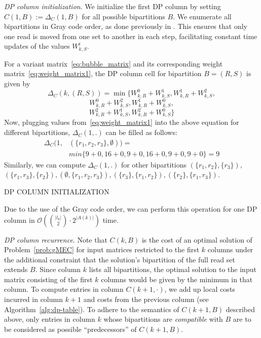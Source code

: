 \textit{DP column initialization}. 
We initialize the first DP column by setting $C(1,B):=\Delta_C(1,B)$ for all possible bipartitions $B$.
We enumerate all bipartitions in Gray code order, as done previously in \cite{patterson2014whatshap}.
This ensures that only one read is moved from one set to another in each step, facilitating constant time updates of the values $W_{k,S}^i$.

For a variant matrix~\eqref{eq:bubble_matrix} and its corresponding weight matrix~\eqref{eq:weight_matrix1}, the DP column cell for bipartition $B=(R,S)$ is given by
\[\Delta_C(k,(R,S))= \min\big\{W^0_{k,R} + W^1_{k,S}, W^1_{k,R} + W^2_{k,S}, \]
\[W^0_{k,R} + W^2_{k,S}, W^1_{k,R} + W^0_{k,S},\]
\[W^2_{k,R} + W^1_{k,S}, W^2_{k,R} + W^0_{k,S} \big\}\]
Now, plugging values from~\eqref{eq:weight_matrix1} into the above equation for different bipartitions, $\Delta_C(1,.)$ can be filled as follows:
\[
\begin{split}
\Delta_C(1,& (\{r_1,r_2,r_3\},\emptyset)) =\\ & min\{9+0, 16+0, 9+0,16+0, 9+0, 9+0\} = 9 
\end{split}
\]
Similarly, we can compute $\Delta_C(1,.)$ for other bipartitions $(\{r_1,r_2\},\{r_3\}),$\\
$(\{r_1,r_3\},\{r_2\}), (\emptyset,\{r_1,r_2,r_3\}), (\{r_3\},\{r_1,r_2\}), (\{r_2\},\{r_1,r_3\})$.

\begin{algorithm}
    \caption{\label{alg:dp-column}\textsc{DP COLUMN INITIALIZATION}}
\end{algorithm}
Due to the use of the Gray code order, we can perform this operation for one DP column in $\mathcal{O}( {|l_k| \choose 2} \cdot 2^{|A(k)|})$ time.

\textit{DP column recurrence}.
Note that $C(k,B)$ is the cost of an optimal solution of Problem~\ref{prob:gMEC} for input matrices restricted to the first $k$ columns under the additional constraint that the solution's bipartition of the full read set extends $B$.
Since column $k$ lists all bipartitions, the optimal solution to the input matrix consisting of the first $k$ columns would be given by the minimum in that column.
To compute entries in column $C(k+1,\cdot)$, we add up local costs incurred in column $k+1$ and costs from the previous column (see Algorithm~\ref{alg:dp-table}).
To adhere to the semantics of $C(k+1,B)$ described above, only entries in column $k$ whose bipartitions are \emph{compatible} with $B$ are to be considered as possible ``predecessors'' of $C(k+1, B)$.

